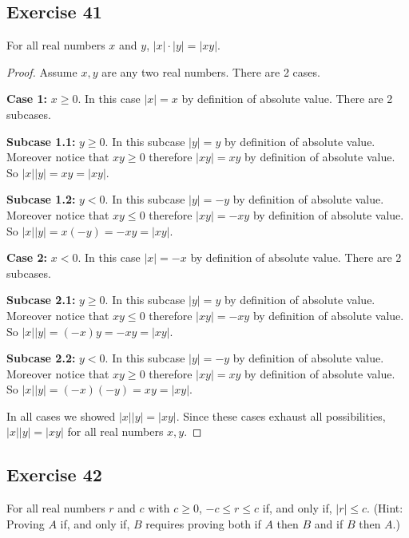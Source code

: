 \documentclass[14pt]{extarticle}
\begin{document}
\subsection{Exercise 41}
For all real numbers $x$ and $y$, $|x| \cdot |y| = |xy|$.

\begin{proof}
Assume $x,y$ are any two real numbers. There are 2 cases.

{\bf Case 1:} $x \geq 0$. In this case $|x| = x$ by definition of absolute value. There are 2 subcases.

{\bf Subcase 1.1:} $y \geq 0$. In this subcase $|y| = y$ by definition of absolute value. Moreover notice that $xy \geq 0$ therefore $|xy| = xy$ by definition of absolute value. So $|x||y| = xy = |xy|$.

{\bf Subcase 1.2:} $y < 0$. In this subcase $|y| = -y$ by definition of absolute value. Moreover notice that $xy \leq 0$ therefore $|xy| = -xy$ by definition of absolute value. So $|x||y| = x(-y) = -xy = |xy|$.

{\bf Case 2:} $x < 0$. In this case $|x| = -x$ by definition of absolute value. There are 2 subcases.

{\bf Subcase 2.1:} $y \geq 0$. In this subcase $|y| = y$ by definition of absolute value. Moreover notice that $xy \leq 0$ therefore $|xy| = -xy$ by definition of absolute value. So $|x||y| = (-x)y = -xy = |xy|$.

{\bf Subcase 2.2:} $y < 0$. In this subcase $|y| = -y$ by definition of absolute value. Moreover notice that $xy \geq 0$ therefore $|xy| = xy$ by definition of absolute value. So $|x||y| = (-x)(-y) = xy = |xy|$.

In all cases we showed $|x||y| = |xy|$. Since these cases exhaust all possibilities, $|x||y| = |xy|$ for all real numbers $x,y$.
\end{proof}

\subsection{Exercise 42}
For all real numbers $r$ and $c$ with $c \geq 0$, $-c \leq r \leq c$ if, and only if, $|r| \leq c$. (Hint: Proving $A$ if, and only if, $B$ requires proving both if $A$ then $B$ and if $B$ then $A$.)
\end{document}
